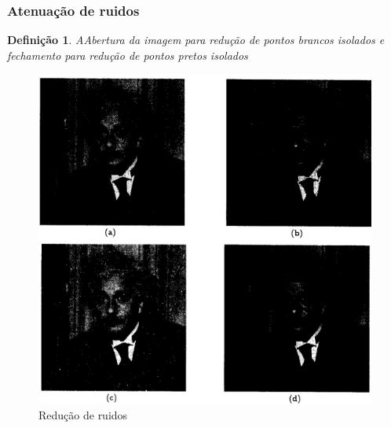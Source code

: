 \documentclass[aspectratio=169]{beamer}
\theoremstyle{Definition}
\newtheorem{defn}{Defini\c c\~ao}
\begin{document}
\begin{frame}
	\frametitle{Atenuação de ruidos}
	
	\begin{defn}
		AAbertura da imagem para redução de pontos brancos isolados e fechamento para redução de pontos pretos isolados
	\end{defn}
	
	\begin{figure}[h]
	 	\includegraphics[height=0.4\paperheight]{imagens/reducaoruidos}
		\caption{Redução de ruidos}\label{figLogical}
	\end{figure}

\end{frame}
\end{document}
